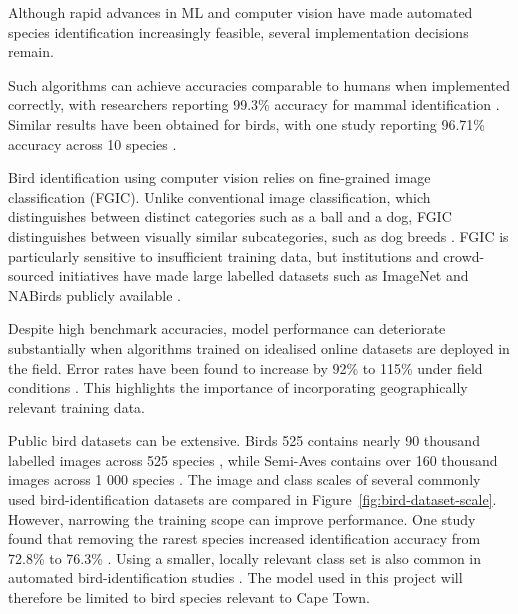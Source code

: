 Although rapid advances in ML and computer vision have made automated species identification increasingly feasible, several implementation decisions remain.
\par\vspace{6pt}
Such algorithms can achieve accuracies comparable to humans when implemented correctly, with researchers reporting 99.3\% accuracy for mammal identification \cite{NorouzzadehEtAl2018}. Similar results have been obtained for birds, with one study reporting 96.71\% accuracy across 10 species \cite{ChalmersEtAl2023}.
\par\vspace{6pt}
Bird identification using computer vision relies on fine-grained image classification (FGIC). Unlike conventional image classification, which distinguishes between distinct categories such as a ball and a dog, FGIC distinguishes between visually similar subcategories, such as dog breeds \cite{GeeksforGeeks2025FGIC}. FGIC is particularly sensitive to insufficient training data, but institutions and crowd-sourced initiatives have made large labelled datasets such as ImageNet and NABirds publicly available \cite{VanHornEtAl2015}.
\par\vspace{6pt}
Despite high benchmark accuracies, model performance can deteriorate substantially when algorithms trained on idealised online datasets are deployed in the field. Error rates have been found to increase by 92\% to 115\% under field conditions \cite{BeeryEtAl2018}. This highlights the importance of incorporating geographically relevant training data.
\par\vspace{6pt}
Public bird datasets can be extensive. Birds 525 contains nearly 90 thousand labelled images across 525 species \cite{PiosenkaBirds525}, while Semi-Aves contains over 160 thousand images across 1 000 species \cite{SuMaji2021}. The image and class scales of several commonly used bird-identification datasets are compared in Figure~\ref{fig:bird-dataset-scale}. However, narrowing the training scope can improve performance. One study found that removing the rarest species increased identification accuracy from 72.8\% to 76.3\% \cite{NormanEtAl2023}. Using a smaller, locally relevant class set is also common in automated bird-identification studies \cite{Mansouri2025, NormanEtAl2023}. The model used in this project will therefore be limited to bird species relevant to Cape Town. 
\par\vspace{6pt}

